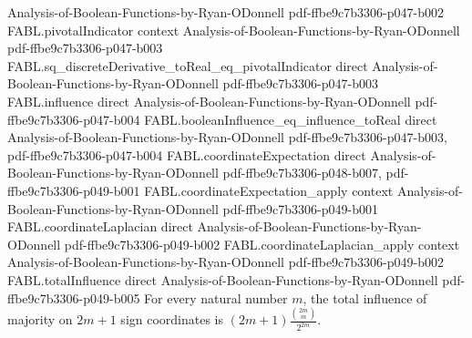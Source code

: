 \begin{theorem}
  {Analysis-of-Boolean-Functions-by-Ryan-ODonnell}
  {pdf-ffbe9c7b3306-p047-b002}
\proofstep
  {FABL.pivotalIndicator}
  {context}
  {Analysis-of-Boolean-Functions-by-Ryan-ODonnell}
  {pdf-ffbe9c7b3306-p047-b003}
\proofstep
  {FABL.sq_discreteDerivative_toReal_eq_pivotalIndicator}
  {direct}
  {Analysis-of-Boolean-Functions-by-Ryan-ODonnell}
  {pdf-ffbe9c7b3306-p047-b003}
\proofstep
  {FABL.influence}
  {direct}
  {Analysis-of-Boolean-Functions-by-Ryan-ODonnell}
  {pdf-ffbe9c7b3306-p047-b004}
\proofstep
  {FABL.booleanInfluence_eq_influence_toReal}
  {direct}
  {Analysis-of-Boolean-Functions-by-Ryan-ODonnell}
  {pdf-ffbe9c7b3306-p047-b003,
    pdf-ffbe9c7b3306-p047-b004}
\proofstep
  {FABL.coordinateExpectation}
  {direct}
  {Analysis-of-Boolean-Functions-by-Ryan-ODonnell}
  {pdf-ffbe9c7b3306-p048-b007,
    pdf-ffbe9c7b3306-p049-b001}
\proofstep
  {FABL.coordinateExpectation_apply}
  {context}
  {Analysis-of-Boolean-Functions-by-Ryan-ODonnell}
  {pdf-ffbe9c7b3306-p049-b001}
\proofstep
  {FABL.coordinateLaplacian}
  {direct}
  {Analysis-of-Boolean-Functions-by-Ryan-ODonnell}
  {pdf-ffbe9c7b3306-p049-b002}
\proofstep
  {FABL.coordinateLaplacian_apply}
  {context}
  {Analysis-of-Boolean-Functions-by-Ryan-ODonnell}
  {pdf-ffbe9c7b3306-p049-b002}
\proofstep
  {FABL.totalInfluence}
  {direct}
  {Analysis-of-Boolean-Functions-by-Ryan-ODonnell}
  {pdf-ffbe9c7b3306-p049-b005}
For every natural number $m$, the total influence of majority on $2m+1$ sign coordinates
is $\displaystyle (2m+1)\frac{\binom{2m}{m}}{2^{2m}}$.
\end{theorem}
